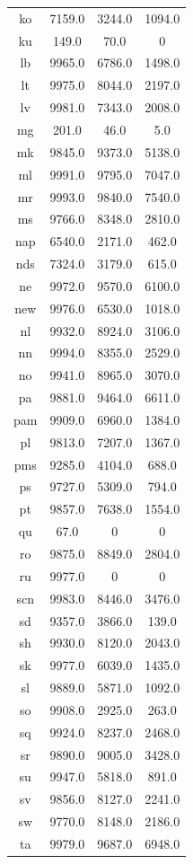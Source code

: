 \documentclass[11pt]{article}
\begin{document}
\begin{figure}[h]
\centering
\begin{tabular}{cccc}
ko&7159.0&3244.0&1094.0\\
ku&149.0&70.0&0\\
lb&9965.0&6786.0&1498.0\\
lt&9975.0&8044.0&2197.0\\
lv&9981.0&7343.0&2008.0\\
mg&201.0&46.0&5.0\\
mk&9845.0&9373.0&5138.0\\
ml&9991.0&9795.0&7047.0\\
mr&9993.0&9840.0&7540.0\\
ms&9766.0&8348.0&2810.0\\
nap&6540.0&2171.0&462.0\\
nds&7324.0&3179.0&615.0\\
ne&9972.0&9570.0&6100.0\\
new&9976.0&6530.0&1018.0\\
nl&9932.0&8924.0&3106.0\\
nn&9994.0&8355.0&2529.0\\
no&9941.0&8965.0&3070.0\\
pa&9881.0&9464.0&6611.0\\
pam&9909.0&6960.0&1384.0\\
pl&9813.0&7207.0&1367.0\\
pms&9285.0&4104.0&688.0\\
ps&9727.0&5309.0&794.0\\
pt&9857.0&7638.0&1554.0\\
qu&67.0&0&0\\
ro&9875.0&8849.0&2804.0\\
ru&9977.0&0&0\\
scn&9983.0&8446.0&3476.0\\
sd&9357.0&3866.0&139.0\\
sh&9930.0&8120.0&2043.0\\
sk&9977.0&6039.0&1435.0\\
sl&9889.0&5871.0&1092.0\\
so&9908.0&2925.0&263.0\\
sq&9924.0&8237.0&2468.0\\
sr&9890.0&9005.0&3428.0\\
su&9947.0&5818.0&891.0\\
sv&9856.0&8127.0&2241.0\\
sw&9770.0&8148.0&2186.0\\
ta&9979.0&9687.0&6948.0\\

\end{tabular}
\end{figure}
\end{document}
